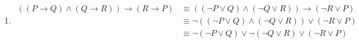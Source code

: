 \documentclass{article}
\newtheorem{prop}[thm]{Proposition}
\begin{document}
\begin{enumerate}[label={(\arabic*)}]
\begin{itemize}
    \item 
    \begin{prop}
        $(P \wedge Q) \rightarrow R \not\equiv P \wedge (Q \rightarrow R)$
    \end{prop}
    \begin{proof}
        \begin{displaymath}
            \begin{array}{|c c c|c|c|}
                P & Q & R & (P \wedge Q) \rightarrow R & P \wedge (Q \rightarrow R) \\
                \hline
                F & T & T & T & F
            \end{array}
        \end{displaymath}
    \end{proof}
\end{itemize}


\item 
\begin{align}
    ((P \rightarrow Q) \wedge (Q \rightarrow R)) \rightarrow (R \rightarrow P) & \equiv ((\neg P \vee Q) \wedge (\neg Q \vee R)) \rightarrow (\neg R \vee P) \\
    & \equiv \neg((\neg P \vee Q) \wedge (\neg Q \vee R)) \vee (\neg R \vee P) \\ 
    & \equiv \neg (\neg P \vee Q) \vee \neg (\neg Q \vee R) \vee (\neg R \vee P)
\end{align}

    
\end{enumerate}
\end{document}
